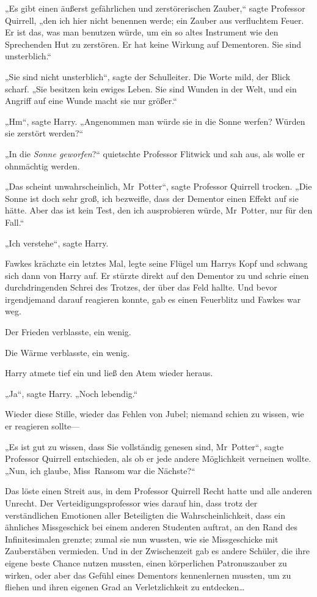 {„Es gibt einen äußerst gefährlichen und zerstörerischen Zauber,“ sagte Professor Quirrell, „den ich hier nicht benennen werde; ein Zauber aus verfluchtem Feuer. Er ist das, was man benutzen würde, um ein so altes Instrument wie den Sprechenden Hut zu zerstören. Er hat keine Wirkung auf Dementoren. Sie sind unsterblich.“

„Sie sind nicht unsterblich“, sagte der Schulleiter. Die Worte mild, der Blick scharf. „Sie besitzen kein ewiges Leben. Sie sind Wunden in der Welt, und ein Angriff auf eine Wunde macht sie nur größer.“

„Hm“, sagte Harry. „Angenommen man würde sie in die Sonne werfen? Würden sie zerstört werden?“

„In die \emph{Sonne geworfen}?“ quietschte Professor Flitwick und sah aus, als wolle er ohnmächtig werden.

„Das scheint unwahrscheinlich, Mr~Potter“, sagte Professor Quirrell trocken. „Die Sonne ist doch sehr groß, ich bezweifle, dass der Dementor einen Effekt auf sie hätte. Aber das ist kein Test, den ich ausprobieren würde, Mr~Potter, nur für den Fall.“

„Ich verstehe“, sagte Harry.

Fawkes krächzte ein letztes Mal, legte seine Flügel um Harrys Kopf und schwang sich dann von Harry auf. Er stürzte direkt auf den Dementor zu und schrie einen durchdringenden Schrei des Trotzes, der über das Feld hallte. Und bevor irgendjemand darauf reagieren konnte, gab es einen Feuerblitz und Fawkes war weg.

Der Frieden verblasste, ein wenig.

Die Wärme verblasste, ein wenig.

Harry atmete tief ein und ließ den Atem wieder heraus.

„Ja“, sagte Harry. „Noch lebendig.“

Wieder diese Stille, wieder das Fehlen von Jubel; niemand schien zu wissen, wie er reagieren sollte—

„Es ist gut zu wissen, dass Sie vollständig genesen sind, Mr~Potter“, sagte Professor Quirrell entschieden, als ob er jede andere Möglichkeit verneinen wollte. „Nun, ich glaube, Miss~Ransom war die Nächste?“

Das löste einen Streit aus, in dem Professor Quirrell Recht hatte und alle anderen Unrecht. Der Verteidigungsprofessor wies darauf hin, dass trotz der verständlichen Emotionen aller Beteiligten die Wahrscheinlichkeit, dass ein ähnliches Missgeschick bei einem anderen Studenten auftrat, an den Rand des Infinitesimalen grenzte; zumal sie nun wussten, wie sie Missgeschicke mit Zauberstäben vermieden. Und in der Zwischenzeit gab es andere Schüler, die ihre eigene beste Chance nutzen mussten, einen körperlichen Patronuszauber zu wirken, oder aber das Gefühl eines Dementors kennenlernen mussten, um zu fliehen und ihren eigenen Grad an Verletzlichkeit zu entdecken…

}
